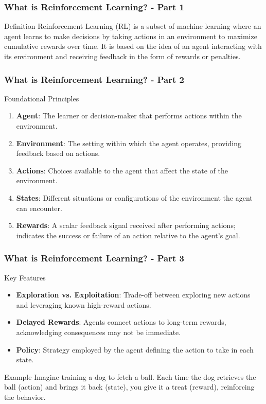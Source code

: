 \documentclass[aspectratio=169]{beamer}
\begin{document}
\begin{frame}[fragile]
    \frametitle{What is Reinforcement Learning? - Part 1}
    \begin{block}{Definition}
        Reinforcement Learning (RL) is a subset of machine learning where an agent learns to make decisions by taking actions in an environment to maximize cumulative rewards over time. It is based on the idea of an agent interacting with its environment and receiving feedback in the form of rewards or penalties.
    \end{block}
\end{frame}

\begin{frame}[fragile]
    \frametitle{What is Reinforcement Learning? - Part 2}
    \begin{block}{Foundational Principles}
        \begin{enumerate}
            \item \textbf{Agent}: The learner or decision-maker that performs actions within the environment.
            \item \textbf{Environment}: The setting within which the agent operates, providing feedback based on actions.
            \item \textbf{Actions}: Choices available to the agent that affect the state of the environment.
            \item \textbf{States}: Different situations or configurations of the environment the agent can encounter.
            \item \textbf{Rewards}: A scalar feedback signal received after performing actions; indicates the success or failure of an action relative to the agent's goal.
        \end{enumerate}
    \end{block}
\end{frame}

\begin{frame}[fragile]
    \frametitle{What is Reinforcement Learning? - Part 3}
    \begin{block}{Key Features}
        \begin{itemize}
            \item \textbf{Exploration vs. Exploitation}: Trade-off between exploring new actions and leveraging known high-reward actions.
            \item \textbf{Delayed Rewards}: Agents connect actions to long-term rewards, acknowledging consequences may not be immediate.
            \item \textbf{Policy}: Strategy employed by the agent defining the action to take in each state.
        \end{itemize}
    \end{block}
    \begin{block}{Example}
        Imagine training a dog to fetch a ball. Each time the dog retrieves the ball (action) and brings it back (state), you give it a treat (reward), reinforcing the behavior.
    \end{block}
\end{frame}
\end{document}
